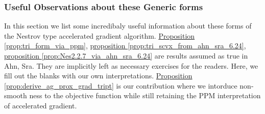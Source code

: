 \documentclass[12pt]{article}
\begin{document}
            
            \begin{definition}
            \label{def:ag_form_similar_tria_II}
                
            \end{definition}


        \subsubsection{Useful Observations about these Generic forms}
        \label{sec:AG_useful_information}

            In this section we list some incredibaly useful information about these forms of the Nestrov type accelerated gradient algorithm. 
            \hyperref[prop:tri_form_via_ppm]{Proposition \ref*{prop:tri_form_via_ppm}}, 
            \hyperref[prop:tri_scvx_from_ahn_sra_6.24]{proposition \ref*{prop:tri_scvx_from_ahn_sra_6.24}}, 
            \hyperref[prop:Nes2.2.7_via_ahn_sra_6.24]{proposition \ref*{prop:Nes2.2.7_via_ahn_sra_6.24}}
            are results assumed as true in Ahn, Sra. 
            They are implicitly left as necessary exercises for the readers. 
            Here, we fill out the blanks with our own interpretations. 
            \hyperref[prop:derive_ag_prox_grad_tript]{Proposition \ref*{prop:derive_ag_prox_grad_tript}} 
            is our contribution where we intorduce non-smooth ness to the objective function while still retaining the PPM interpretation of accelerated gradient. 
            
\end{document}
